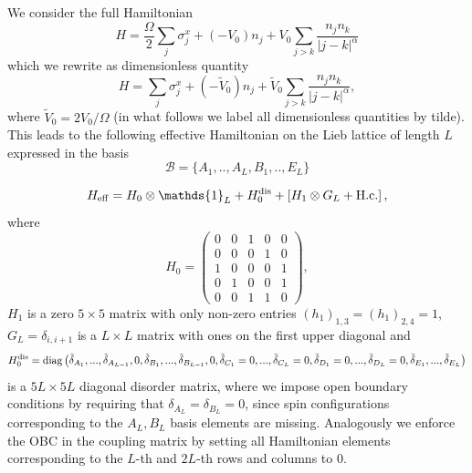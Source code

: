 \documentclass[prl,aps,twocolumn,showpacs,superscriptaddress,longbibliography]{revtex4-1}
\begin{document}
We consider the full Hamiltonian
\begin{equation}
	H = \frac{\Omega}{2} \sum_j \sigma^x_j + (-V_0) n_j + V_0 \sum_{j>k} \frac{n_j n_k}{|j-k|^\alpha}
\end{equation}
which we rewrite as dimensionless quantity
\begin{equation}
	H = \sum_j \sigma^x_j + (-\tilde{V}_0) n_j + \tilde{V}_0 \sum_{j>k} \frac{n_j n_k}{|j-k|^\alpha},
\end{equation}
where $\tilde{V}_0 = 2 V_0/\Omega$ (in what follows we label all dimensionless quantities by tilde). This leads to the following effective Hamiltonian on the Lieb lattice of length $L$ expressed in the basis
\begin{equation}
	\mathcal{B}=\{A_1,..,A_L,B_1,..,E_L\}
	\label{eq:basis}
\end{equation}

\begin{equation}
	H_{\rm eff} = H_0 \otimes \mathds{1}_L + H_0^{\rm dis} + \left[ H_1 \otimes G_L + {\rm H.c.} \right],
	\label{eq:H eff}
\end{equation}
where
\begin{equation}
	H_0 =
 \begin{pmatrix}
  	 0 & 0 & 1 & 0 & 0 \\
     0 & 0 & 0 & 1 & 0 \\
     1 & 0 & 0 & 0 & 1 \\
     0 & 1 & 0 & 0 & 1 \\
     0 & 0 & 1 & 1 & 0
 \end{pmatrix},
\end{equation}
$H_1$ is a zero $5 \times 5$ matrix with only non-zero entries $(h_1)_{1,3}=(h_1)_{2,4}=1$, $G_L = \delta_{i,i+1}$ is a $L \times L$ matrix with ones on the first upper diagonal and 
\begin{equation}
	H_0^{\rm dis} = {\rm diag} \left( \tilde{\delta}_{A_1},...,\tilde{\delta}_{A_{L-1}},0,\tilde{\delta}_{B_1},...,\tilde{\delta}_{B_{L-1}},0,\tilde{\delta}_{C_1}=0,...,\tilde{\delta}_{C_{L}}=0,\tilde{\delta}_{D_1}=0,...,\tilde{\delta}_{D_{L}}=0,\tilde{\delta}_{E_1},...,\tilde{\delta}_{E_{L}}\right)
	\label{eq:disorder}
\end{equation}
is a $5L \times 5L$ diagonal disorder matrix, where we impose open boundary conditions by requiring that $\delta_{A_L} = \delta_{B_L}=0$, since spin configurations corresponding to the $A_L,B_L$ basis elements are missing. Analogously we enforce the OBC in the coupling matrix by setting all Hamiltonian elements corresponding to the $L$-th and $2L$-th rows and columns to 0. 
\end{document}

